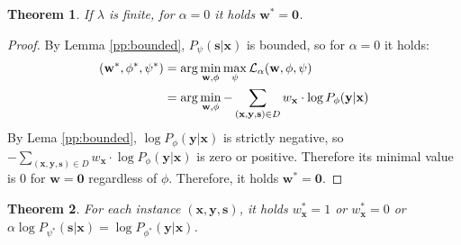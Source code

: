 \documentclass[preprint,12pt]{elsarticle}
\newtheorem{theorem}{Theorem}
\begin{document}
\begin{theorem}
	If $\lambda$ is finite, for $\alpha=0$ it holds $\mathbf{w}^*=\mathbf{0}$.
	\label{pp:zero}
\end{theorem}
\begin{proof}
	By Lemma \ref{pp:bounded}, $P_{\psi}(\mathbf{s}|\mathbf{x})$ is bounded, so for $\alpha=0$ it holds:
	\begin{align*}
	(\mathbf{w}^*,\phi^*,\psi^*)&=\arg\min_{\mathbf{w},\phi}\max_{\psi}{\cal L}_\alpha(\mathbf{w},\phi,\psi)\\
	&=\arg\min_{\mathbf{w},\phi}- \sum_{(\mathbf{x},\mathbf{y},\mathbf{s})\in D} w_\mathbf{x} \cdot \log P_{\phi}(\mathbf{y}|\mathbf{x})
	\end{align*}
	By Lema \ref{pp:bounded}, $\log P_{\phi}(\mathbf{y}|\mathbf{x})$ is strictly negative, so $- \sum_{(\mathbf{x},\mathbf{y},\mathbf{s})\in D} w_\mathbf{x} \cdot \log P_{\phi}(\mathbf{y}|\mathbf{x})$ is zero or positive. Therefore its minimal value is $0$ for $\mathbf{w}=\mathbf{0}$ regardless of $\phi$.
	Therefore, it holds $\mathbf{w}^*=\mathbf{0}$.
\end{proof}

\begin{theorem}
	For each instance $(\mathbf{x},\mathbf{y},\mathbf{s})$, it holds
	$w_{\mathbf{x}}^*= 1$ or $w_{\mathbf{x}}^*= 0$ or $\alpha\log P_{\psi^*}(\mathbf{s}|\mathbf{x})=\log P_{\phi^*}(\mathbf{y}|\mathbf{x})$.
	\label{pp:anypoint}
\end{theorem}

\end{document}
